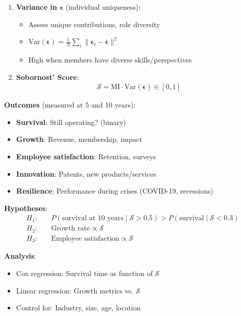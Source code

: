 \documentclass[11pt,a4paper]{article}
\theoremstyle{definition}
\theoremstyle{remark}
\begin{document}
\begin{enumerate}
\begin{protocol}
\begin{enumerate}
    \item \textbf{Variance in \(\boldsymbol{\epsilon}\)} (individual uniqueness):
        \begin{itemize}
            \item Assess unique contributions, role diversity
            \item \(\text{Var}(\boldsymbol{\epsilon}) = \frac{1}{N}\sum_i \|\boldsymbol{\epsilon}_i - \bar{\boldsymbol{\epsilon}}\|^2\)
            \item High when members have diverse skills/perspectives
        \end{itemize}
    
    \item \textbf{Sobornost' Score}:
        \begin{align}
        \mathcal{S} = \text{MI} \cdot \text{Var}(\boldsymbol{\epsilon}) \in [0, 1]
        \end{align}
\end{enumerate}

\textbf{Outcomes} (measured at 5 and 10 years):
\begin{itemize}
    \item \textbf{Survival}: Still operating? (binary)
    \item \textbf{Growth}: Revenue, membership, impact
    \item \textbf{Employee satisfaction}: Retention, surveys
    \item \textbf{Innovation}: Patents, new products/services
    \item \textbf{Resilience}: Performance during crises (COVID-19, recessions)
\end{itemize}

\textbf{Hypotheses}:
\begin{align}
H_1: \quad &P(\text{survival at 10 years} \mid \mathcal{S} > 0.5) > P(\text{survival} \mid \mathcal{S} < 0.3) \\
H_2: \quad &\text{Growth rate} \propto \mathcal{S} \\
H_3: \quad &\text{Employee satisfaction} \propto \mathcal{S}
\end{align}

\textbf{Analysis}:
\begin{itemize}
    \item Cox regression: Survival time as function of \(\mathcal{S}\)
    \item Linear regression: Growth metrics vs. \(\mathcal{S}\)
    \item Control for: Industry, size, age, location
\end{itemize}


\end{protocol}
\end{enumerate}
\end{document}
